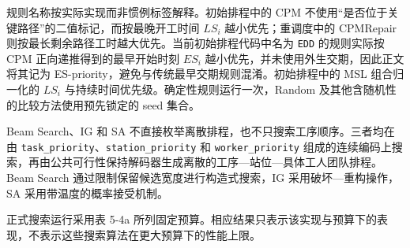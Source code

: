 \documentclass[journal,10pt]{IEEEtran}
\begin{document}
规则名称按实际实现而非惯例标签解释。初始排程中的 CPM 不使用``是否位于关键路径''的二值标记，而按最晚开工时间 \(LS_i\) 越小优先；重调度中的 CPMRepair 则按最长剩余路径工时越大优先。当前初始排程代码中名为 \texttt{EDD} 的规则实际按 CPM 正向递推得到的最早开始时刻 \(ES_i\) 越小优先，并未使用外生交期，因此正文将其记为 ES-priority，避免与传统最早交期规则混淆。初始排程中的 MSL 组合归一化的 \(LS_i\) 与持续时间优先级。确定性规则运行一次，Random 及其他含随机性的比较方法使用预先锁定的 seed 集合。

Beam Search、IG 和 SA 不直接枚举离散排程，也不只搜索工序顺序。三者均在由 \texttt{task\_priority}、\texttt{station\_priority} 和 \texttt{worker\_priority} 组成的连续编码上搜索，再由公共可行性保持解码器生成离散的工序---站位---具体工人团队排程。Beam Search 通过限制保留候选宽度进行构造式搜索，IG 采用破坏---重构操作，SA 采用带温度的概率接受机制。

正式搜索运行采用表 5-4a 所列固定预算。相应结果只表示该实现与预算下的表现，不表示这些搜索算法在更大预算下的性能上限。
\end{document}
